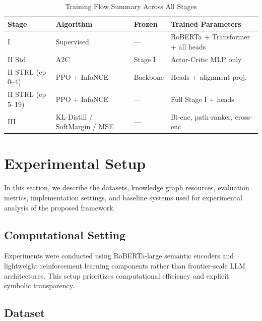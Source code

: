 \documentclass[10pt,conference]{IEEEtran}
\begin{document}
\begin{table}[h]
\centering
\caption{Training Flow Summary Across All Stages}
\label{tab:training_flow}
\renewcommand{\arraystretch}{1.2}
\begin{tabularx}{\columnwidth}{>{\raggedright}p{1.2cm} >{\raggedright}p{1.5cm} >{\raggedright}p{1.4cm} >{\raggedright\arraybackslash}X}
\toprule
\textbf{Stage} & \textbf{Algorithm} & \textbf{Frozen} & \textbf{Trained Parameters} \\
\midrule
I & Supervised & --- & RoBERTa + Transformer + all heads \\
II Std & A2C & Stage I & Actor-Critic MLP only \\
II STRL (ep 0--4) & PPO + InfoNCE & Backbone & Heads + alignment proj. \\
II STRL (ep 5--19) & PPO + InfoNCE & --- & Full Stage I + heads \\
III & KL-Distill / SoftMargin / MSE & --- & Bi-enc, path-ranker, cross-enc \\
\bottomrule
\end{tabularx}
\end{table}


\section{Experimental Setup}

In this section, we describe the datasets, knowledge graph resources, evaluation metrics, implementation settings, and baseline systems used for experimental analysis of the proposed framework.

\subsection{Computational Setting}

Experiments were conducted using RoBERTa-large semantic encoders and lightweight reinforcement learning components rather than frontier-scale LLM architectures. This setup prioritizes computational efficiency and explicit symbolic transparency.

\subsection{Dataset}
\end{document}
